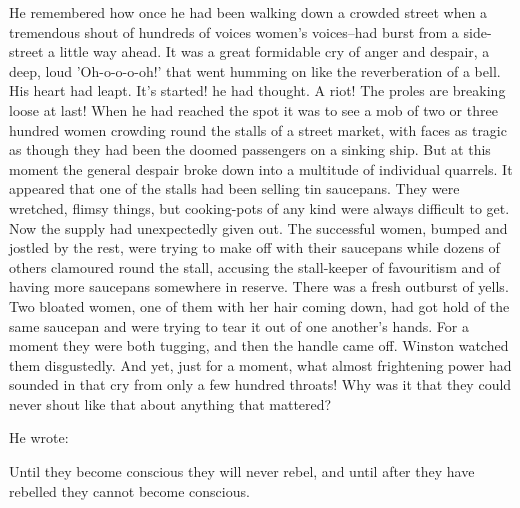 \documentclass{article}
\begin{document}
He remembered how once he had been walking down a crowded street when a
tremendous shout of hundreds of voices women's voices--had burst from a
side-street a little way ahead. It was a great formidable cry of anger
and despair, a deep, loud 'Oh-o-o-o-oh!' that went humming on like the
reverberation of a bell. His heart had leapt. It's started! he had thought.
A riot! The proles are breaking loose at last! When he had reached the spot
it was to see a mob of two or three hundred women crowding round the stalls
of a street market, with faces as tragic as though they had been the doomed
passengers on a sinking ship. But at this moment the general despair broke
down into a multitude of individual quarrels. It appeared that one of the
stalls had been selling tin saucepans. They were wretched, flimsy things,
but cooking-pots of any kind were always difficult to get. Now the supply
had unexpectedly given out. The successful women, bumped and jostled by
the rest, were trying to make off with their saucepans while dozens of
others clamoured round the stall, accusing the stall-keeper of favouritism
and of having more saucepans somewhere in reserve. There was a fresh
outburst of yells. Two bloated women, one of them with her hair coming
down, had got hold of the same saucepan and were trying to tear it out of
one another's hands. For a moment they were both tugging, and then the
handle came off. Winston watched them disgustedly. And yet, just for a
moment, what almost frightening power had sounded in that cry from only
a few hundred throats! Why was it that they could never shout like that
about anything that mattered?

He wrote:


   Until they become conscious they will never rebel, and until after they
have rebelled they cannot become conscious.
\end{document}
